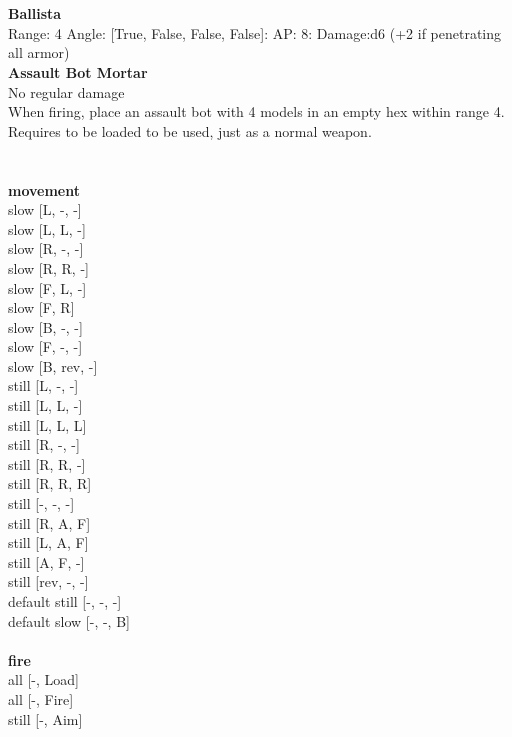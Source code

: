 \ \\

\ \\
{\bf Ballista } \\



Range: 4  Angle: [True, False, False, False]: AP: 8: Damage:d6 (+2 if penetrating all armor) \\




{\bf Assault Bot Mortar } \\

No regular damage\\ 
When firing, place an assault bot with 4 models in an empty hex within range 4. Requires to be loaded to be used, just as a normal weapon.\\ 





 
\ \\



\ \\ {\bf movement } \\
slow [L, -, -] \\
slow [L, L, -] \\
slow [R, -, -] \\
slow [R, R, -] \\
slow [F, L, -] \\
slow [F, R] \\
slow [B, -, -] \\
slow [F, -, -] \\
slow [B, rev, -] \\
still [L, -, -] \\
still [L, L, -] \\
still [L, L, L] \\
still [R, -, -] \\
still [R, R, -] \\
still [R, R, R] \\
still [-, -, -] \\
still [R, A, F] \\
still [L, A, F] \\
still [A, F, -] \\
still [rev, -, -] \\
default still [-, -, -] \\
default slow [-, -, B] \\
\ \\ {\bf fire } \\
all [-, Load] \\
all [-, Fire] \\
still [-, Aim] \\


